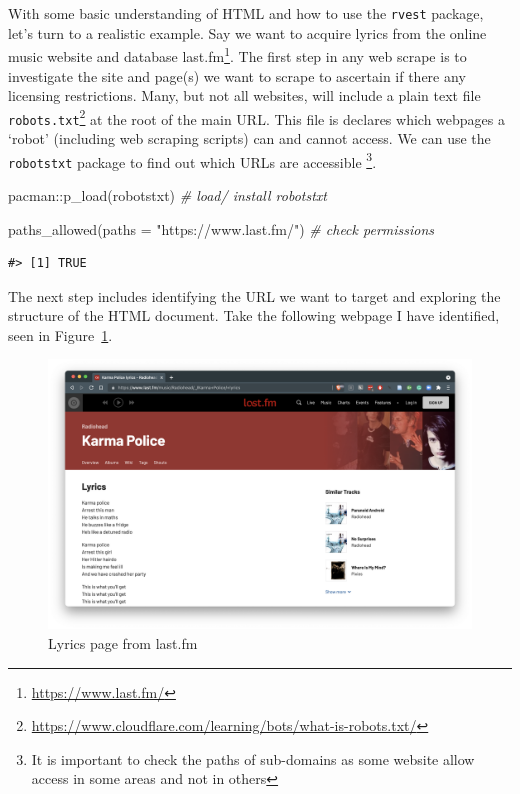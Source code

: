 \documentclass[
  letterpaper,
]{scrbook}
\newenvironment{Shaded}{\begin{snugshade}}{\end{snugshade}}
\newcommand{\AttributeTok}[1]{\textcolor[rgb]{0.00,0.00,0.00}{#1}}
\newcommand{\CommentTok}[1]{\textcolor[rgb]{0.00,0.00,0.00}{\textit{#1}}}
\newcommand{\FunctionTok}[1]{\textcolor[rgb]{0.00,0.00,0.00}{#1}}
\newcommand{\NormalTok}[1]{\textcolor[rgb]{0.00,0.00,0.00}{#1}}
\newcommand{\SpecialCharTok}[1]{\textcolor[rgb]{0.00,0.00,0.00}{#1}}
\newcommand{\StringTok}[1]{\textcolor[rgb]{0.00,0.00,0.00}{#1}}
\DeclareRobustCommand{\href}[2]{#2\footnote{\url{#1}}}
\begin{document}
With some basic understanding of HTML and how to use the \texttt{rvest}
package, let's turn to a realistic example. Say we want to acquire
lyrics from the online music website and database
\href{https://www.last.fm/}{last.fm}. The first step in any web scrape
is to investigate the site and page(s) we want to scrape to ascertain if
there any licensing restrictions. Many, but not all websites, will
include a plain text file
\href{https://www.cloudflare.com/learning/bots/what-is-robots.txt/}{\texttt{robots.txt}}
at the root of the main URL. This file is declares which webpages a
`robot' (including web scraping scripts) can and cannot access. We can
use the \texttt{robotstxt} package to find out which URLs are accessible
\footnote{It is important to check the paths of sub-domains as some
  website allow access in some areas and not in others}.

\begin{Shaded}
\begin{Highlighting}[]
\NormalTok{pacman}\SpecialCharTok{::}\FunctionTok{p\_load}\NormalTok{(robotstxt) }\CommentTok{\# load/ install \textasciigrave{}robotstxt\textasciigrave{}}

\FunctionTok{paths\_allowed}\NormalTok{(}\AttributeTok{paths =} \StringTok{"https://www.last.fm/"}\NormalTok{) }\CommentTok{\# check permissions}
\end{Highlighting}
\end{Shaded}

\begin{verbatim}
#> [1] TRUE
\end{verbatim}

The next step includes identifying the URL we want to target and
exploring the structure of the HTML document. Take the following webpage
I have identified, seen in
Figure~\ref{fig-ad-example-lyrics-page-lastfm}.

\begin{figure}[h]

{\centering \includegraphics[width=9.28in,height=\textheight]{./figures/acquire-data/ad-lastfm-webpage-lyrics.png}

}

\caption{\label{fig-ad-example-lyrics-page-lastfm}Lyrics page from
last.fm}

\end{figure}
\end{document}
